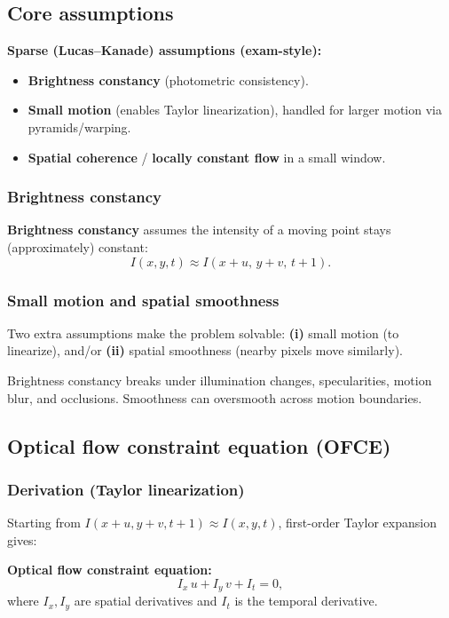 \documentclass[11pt,a4paper]{article}
\begin{document}
\subsection{Core assumptions}
\begin{notebox}
\textbf{Sparse (Lucas--Kanade) assumptions (exam-style):}
\begin{itemize}
  \item \textbf{Brightness constancy} (photometric consistency).
  \item \textbf{Small motion} (enables Taylor linearization), handled for larger motion via pyramids/warping.
  \item \textbf{Spatial coherence} / \textbf{locally constant flow} in a small window.
\end{itemize}
\end{notebox}

\subsubsection{Brightness constancy}
\begin{defbox}
\textbf{Brightness constancy} assumes the intensity of a moving point stays (approximately) constant:
\[
I(x,y,t)\approx I(x+u,\,y+v,\,t+1).
\]
\end{defbox}

\subsubsection{Small motion and spatial smoothness}
\begin{intbox}
Two extra assumptions make the problem solvable:
\textbf{(i)} small motion (to linearize), and/or \textbf{(ii)} spatial smoothness (nearby pixels move similarly).
\end{intbox}

\begin{qbox}
Brightness constancy breaks under illumination changes, specularities, motion blur, and occlusions.
Smoothness can oversmooth across motion boundaries.
\end{qbox}

\subsection{Optical flow constraint equation (OFCE)}

\subsubsection{Derivation (Taylor linearization)}
Starting from $I(x+u,y+v,t+1)\approx I(x,y,t)$, first-order Taylor expansion gives:
\begin{mathrule}
\textbf{Optical flow constraint equation:}\quad
\[
I_x\,u + I_y\,v + I_t = 0,
\]
where $I_x,I_y$ are spatial derivatives and $I_t$ is the temporal derivative.
\end{mathrule}
\end{document}
